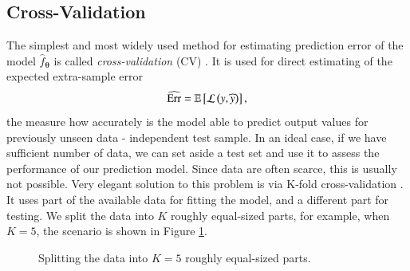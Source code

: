 \subsection{Cross-Validation}
The simplest and most widely used method for estimating prediction error of  the model $\hat{f}_{\boldsymbol{\theta}}$ is called \emph{cross-validation} (CV) \cite{statistics}. It is used for direct estimating of the expected extra-sample error
\begin{equation}
	\widehat{\mathrm{Err}} = \mathbb{E}\left[\mathcal{L}\left(y, \widehat{y}\right)\right],
\end{equation}
the measure how accurately is the model able to predict output values for previously unseen data - independent test sample. In an ideal case, if we have sufficient number of data, we can set aside a test set and use
it to assess the performance of our prediction model. Since data are often
scarce, this is usually not possible. Very elegant solution to this problem is via K-fold cross-validation \cite{statistics}. It
uses part of the available data for fitting the model, and a different
part for testing. We split the data into $K$ roughly equal-sized parts, for
example, when $K = 5$, the scenario is shown in Figure \ref{fig:KFOLD}. 
\begin{figure}[h]
\begin{center}
\end{center}
\caption{Splitting the data into $K=5$ roughly equal-sized parts.}
\label{fig:KFOLD}
\end{figure}

